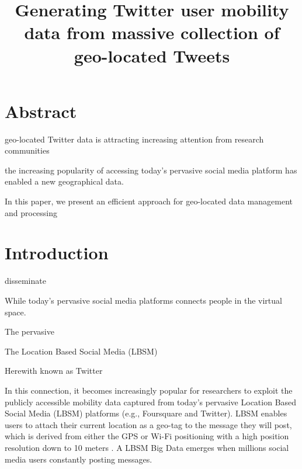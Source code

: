 \documentclass[a4paper,11pt]{article}
\begin{document}
\title{Generating Twitter user mobility data from massive collection of geo-located Tweets}


\maketitle
\section*{Abstract}
geo-located Twitter data is attracting increasing attention from research communities


the increasing popularity of accessing today's pervasive social media platform has enabled a new geographical data.

In this paper, we present an efficient approach for geo-located data management and processing

\section{Introduction}



disseminate  

While today's pervasive social media platforms connects people in the virtual space.

The pervasive 


The Location Based Social Media (LBSM)

Herewith known as Twitter

In this connection, it becomes increasingly popular for researchers to exploit the publicly accessible mobility data captured from today's pervasive Location Based Social Media (LBSM) platforms (e.g., Foursquare and Twitter).
LBSM enables users to attach their current location as a geo-tag to the message they will post, which is derived from either the GPS or Wi-Fi positioning with a high position resolution down to 10 meters \cite{Jurdak2015}.
A LBSM Big Data emerges when millions social media users constantly posting messages.
\end{document}
